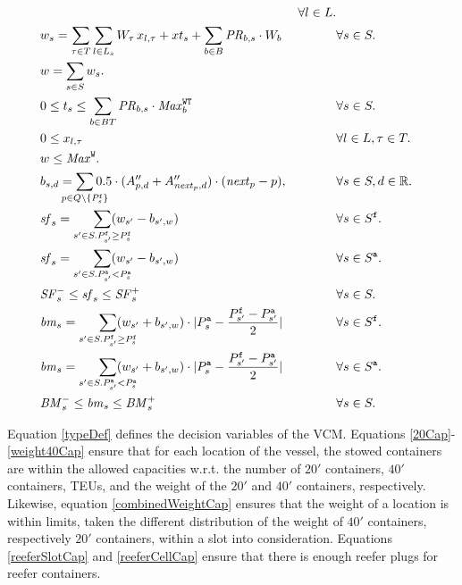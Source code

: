 \documentclass[citeauthoryear]{llncs}
\newcommand{\trt}[1]{\texttt{#1}}
\newcommand{\mi}{\mathit}
\newcommand{\set}[2]{\{\;{#1}\;|\;{#2}\;\}}
\begin{document}
\begin{align}
			&& \forall l \in L.\\
	\label{totalWeightDef}
	&w_s = \sum_{\tau \in T} \sum_{l\in L_s} W_\tau\, x_{l,\tau} + xt_s + \sum_{b\in B} \mi{PR}_{b,s}\cdot W_b 
			&& \forall s \in S.\\
	\label{totalDisp}
	&w  = \sum_{s\in S} w_s. 
			&&\\
	\label{btLim}
	&0 \leq t_s \leq \sum_{b \in BT} \mi{PR}_{b,s}\cdot \mi{Max}^\trt{WT}_b 
			&& \forall s\in S.\\
	\label{xPos}
	&0 \leq x_{l,\tau} 
			&& \forall l\in L, \tau\in T.\\
	\label{wTotalLim}
	&w \leq \mi{Max}^\trt{W}. 
			&&\\
	\label{defBancy}
	&b_{s,d} = \smashoperator[lr]{\sum_{p \in Q\setminus \{P^\trt{f}_s\}}} 0.5\cdot(A''_{p,d}+A''_{\mi{next}_p,d})\cdot (\mi{next}_p-p), 
			&& \forall s\in S, d\in \mathbb{R}.\\%
	\label{sfF}
	&\mi{sf}_s = \smashoperator[r]{\sum_{s' \in S. P^\texttt{f}_{s'} \geq P^\texttt{f}_s}} (w_{s'} - b_{s',w}) 
			&& \forall s \in S^\texttt{f}.\\
	\label{sfA}
	&\mi{sf}_s = \smashoperator[r]{\sum_{s' \in S. P^\texttt{a}_{s'} < P^\texttt{a}_s}} (w_{s'} - b_{s',w}) 
			&& \forall s \in S^\texttt{a}.\\
	\label{sfLim}
	&\mi{SF}^-_s \leq \mi{sf}_s \leq \mi{SF}^+_s
			&& \forall s \in S.\\
	\label{bmF}
	&\mi{bm}_s = 	\smashoperator[r]{\sum_{s' \in S. P^\texttt{f}_{s'} \geq P^\texttt{f}_s}} (w_{s'} + b_{s',w})\cdot |P^\trt{a}_s - \frac{P^\trt{f}_{s'}-P^\trt{a}_{s'}}{2}|
			&& \forall s \in S^\texttt{f}.\\
	\label{bmA}
	&\mi{bm}_s = \smashoperator[r]{\sum_{s' \in S. P^\texttt{a}_{s'} < P^\texttt{a}_s}} (w_{s'} + b_{s',w})\cdot |P^\trt{a}_s - \frac{P^\trt{f}_{s'}-P^\trt{a}_{s'}}{2}|
			&& \forall s \in S^\texttt{a}.\\
	\label{bmLim}
	&\mi{BM}^-_s \leq \mi{bm}_s \leq \mi{BM}^+_s 
			&& \forall s \in S. 
\end{align}

Equation \eqref{typeDef} defines the decision variables of the VCM. Equations \eqref{20Cap}-\eqref{weight40Cap} ensure that for each location of the vessel, the stowed containers are within the allowed capacities w.r.t. the number of $20'$ containers, $40'$ containers, TEUs, and the weight of the $20'$ and $40'$ containers, respectively.
Likewise, equation \eqref{combinedWeightCap} ensures that the weight of a location is within limits, taken the different distribution of the weight of $40'$ containers, respectively $20'$ containers, within a slot into consideration. Equations \eqref{reeferSlotCap} and \eqref{reeferCellCap} ensure that there is enough reefer plugs for reefer containers. 
\end{document}
